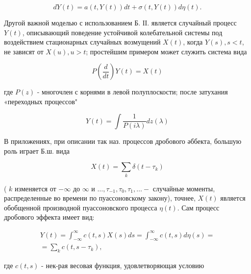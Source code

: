 \documentclass[10pt]{article}
\begin{document}
\[

d Y(t)=a(t, Y(t)) d t+\sigma(t, Y(t)) d \eta(t) .

\]



Другой важной моделью с использованием Б. ІІ. является случайный процесс $Y(t)$, описывающий поведение устойчивой колебательной системы под воздействием стационарных случайных возмущений $X(t)$, когда $Y(s), s<t$, не зависят от $X(u), u>t$; простейшим примером может служить система вида



\[

P\left(\frac{d}{d t}\right) Y(t)=X(t)

\]



где $P(z)$ - многочлен с корнями в левой полуплоскости; после затухания «переходных процессов"



\[

Y(t)=\int \frac{1}{P(i \lambda)} d z(\lambda)

\]



В приложениях, при описании так наз. процессов дробового әббекта, большую роль играет Б.ш. вида



\[

X(t)=\sum_{k} \delta\left(t-\tau_{k}\right)

\]



( $k$ изменяется от $-\infty$ до $\infty$ и $\ldots, \tau_{-1}, \tau_{0}, \tau_{1}, \ldots-$ случайные моменты, распределенные во времени по пуассоновскому закону), точнее, $X(t)$ является обобщенной производной пуассоновского процесса $\eta(t)$. Сам процесс дробового эффекта имеет вид:



\[

\begin{gathered}

Y(t)=\int_{-\infty}^{\infty} c(t, s) X(s) d s=\int_{-\infty}^{\infty} c(t, s) d \eta(s)= \\

=\sum_{k} c\left(t, s-\tau_{k}\right),

\end{gathered}

\]



где $c(t, s)$ - нек-рая весовая функция, удовлетворяющая условию
\end{document}
